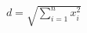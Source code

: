 \documentclass[preview]{standalone}
\begin{document}
\begin{align*}
d = \sqrt{\sum_{i=1}^n x_i^2}
\end{align*}
\end{document}
